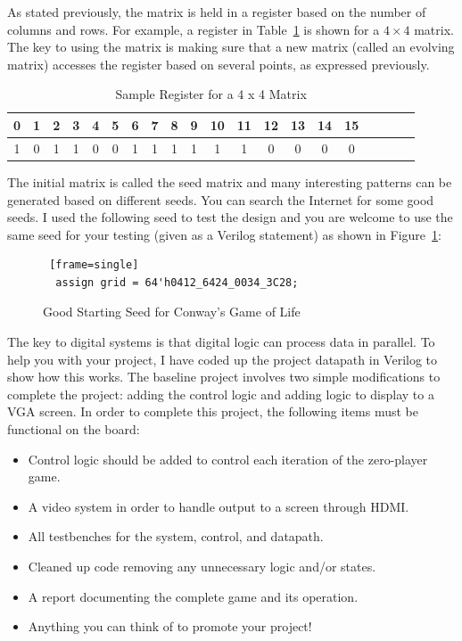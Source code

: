 \documentclass{article}
\begin{document}
As stated previously, the matrix is held in a register based on the number of columns and rows.
For example, a register in Table~\ref{matrix4x4} is shown for a
$4 \times 4$ matrix. The key to using the matrix is
making sure that a new matrix (called an evolving matrix) accesses the register based on several
points, as expressed previously.
\begin{table}
  \centering
  \begin{tabular} {|c|c|c|c|c|c|c|c|c|c|c|c|c|c|c|c|c|c|c|c} \hline
    0 & 1 & 2 & 3 & 4 & 5 & 6 & 7 & 8 & 9 & 10 & 11 & 12 & 13 & 14 &
    15 \\ \hline \hline
    1 & 0 & 1 & 1 & 0 & 0 & 1 & 1 & 1 & 1 & 1 & 1 & 0 & 0 & 0 & 0 \\ \hline
  \end{tabular}
  \caption{Sample Register for a 4 x 4 Matrix}
  \label{matrix4x4}
\end{table}

The initial matrix is called the seed matrix and many interesting patterns can be generated based
on different seeds. You can search the Internet for some good seeds. I used the following seed
to test the design and you are welcome to use the same seed for your testing (given as a Verilog
statement) as shown in Figure~\ref{starting-seed}:
\begin{figure}
\begin{Verbatim} [frame=single]
  assign grid = 64'h0412_6424_0034_3C28;
\end{Verbatim}
\caption{Good Starting Seed for Conway's Game of Life}
\label{starting-seed}
\end{figure}

The key to digital systems is that digital logic can process data in parallel. To help you with your
project, I have coded up the project datapath in Verilog to show how this works. The baseline
project involves two simple modifications to complete the project: adding the control logic and
adding logic to display to a VGA screen.
In order to complete this project, the following items must be
functional on the board:
\begin{itemize}
\item Control logic should be added to control each iteration of the
  zero-player game.
\item A video system in order to handle output to a screen through HDMI.
\item All testbenches for the system, control, and datapath.
\item Cleaned up code removing any unnecessary logic and/or states.
\item A report documenting the complete game and its operation.
\item Anything you can think of to promote your project!
\end{itemize}
\end{document}
